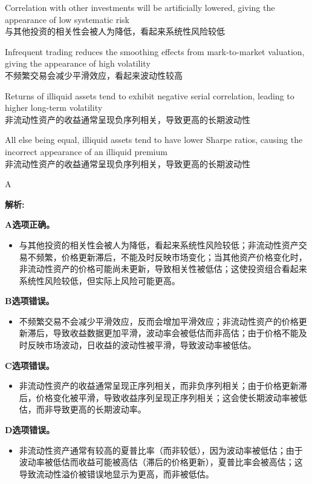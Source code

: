 \documentclass{article}
\newenvironment{explanation}
{\textbf{解析:}\par}
{\par}
\begin{document}
\begin{choices}
    \item Correlation with other investments will be artificially lowered, giving the appearance of low systematic risk\\
    与其他投资的相关性会被人为降低，看起来系统性风险较低
    \item Infrequent trading reduces the smoothing effects from mark-to-market valuation, giving the appearance of high volatility\\
    不频繁交易会减少平滑效应，看起来波动性较高
    \item Returns of illiquid assets tend to exhibit negative serial correlation, leading to higher long-term volatility\\
    非流动性资产的收益通常呈现负序列相关，导致更高的长期波动性
    \item All else being equal, illiquid assets tend to have lower Sharpe ratios, causing the incorrect appearance of an illiquid premium\\
    非流动性资产的收益通常呈现负序列相关，导致更高的长期波动性
\end{choices}

\begin{correctanswer}
    A
\end{correctanswer}

\begin{explanation}
    \textbf{A选项正确。}
    \begin{itemize}
        \item 与其他投资的相关性会被人为降低，看起来系统性风险较低；非流动性资产交易不频繁，价格更新滞后，不能及时反映市场变化；当其他资产价格变化时，非流动性资产的价格可能尚未更新，导致相关性被低估；这使投资组合看起来系统性风险较低，但实际上风险可能更高。
    \end{itemize}

    \textbf{B选项错误。}
    \begin{itemize}
        \item 不频繁交易不会减少平滑效应，反而会增加平滑效应；非流动性资产的价格更新滞后，导致收益数据更加平滑，波动率会被低估而非高估；由于价格不能及时反映市场波动，日收益的波动性被平滑，导致波动率被低估。
    \end{itemize}

    \textbf{C选项错误。}
    \begin{itemize}
        \item 非流动性资产的收益通常呈现正序列相关，而非负序列相关；由于价格更新滞后，价格变化被平滑，导致收益序列呈现正序列相关；这会使长期波动率被低估，而非导致更高的长期波动率。
    \end{itemize}

    \textbf{D选项错误。}
    \begin{itemize}
        \item 非流动性资产通常有较高的夏普比率（而非较低），因为波动率被低估；由于波动率被低估而收益可能被高估（滞后的价格更新），夏普比率会被高估；这导致流动性溢价被错误地显示为更高，而非被低估。
    \end{itemize}
\end{explanation}
\end{document}
